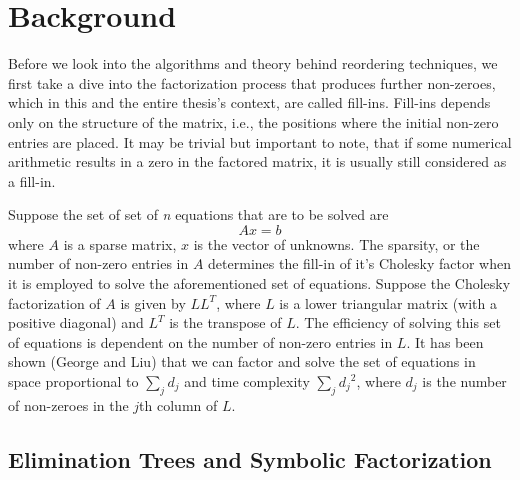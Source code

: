 

\chapter{Background}
\label{ch:background}



Before we look into the algorithms and theory behind reordering techniques, we first take a dive into the factorization process that produces further non-zeroes, which in this and the entire thesis's context, are called fill-ins. Fill-ins depends only on the structure of the matrix, i.e., the positions where the initial non-zero entries are placed. It may be trivial but important to note, that if some numerical arithmetic results in a zero in the factored matrix, it is usually still considered as a fill-in. 

Suppose the set of set of \textit{n} equations that are to be solved are
\begin{equation}
    Ax = b
\end{equation}
where \(A\) is a sparse matrix, \(x\) is the vector of unknowns. The sparsity, or the number of non-zero entries in \(A\) determines the fill-in of it's Cholesky factor when it is employed to solve the aforementioned set of equations. 
Suppose the Cholesky factorization of \(A\) is given by \(LL^T\), where \(L\) is a lower triangular matrix (with a positive diagonal) and \(L^T\) is the transpose of \(L\). The efficiency of solving this set of equations is dependent on the number of non-zero entries in \(L\). It has been shown (George and Liu) that we can factor and solve the set of equations in space proportional to  \(\sum_j d_j\) and time complexity \(\sum_j {d_j}^2\), where \(d_j\) is the number of non-zeroes in the \(j\)th column of \(L\).


\section{Elimination Trees and Symbolic Factorization}
\label{sec:elim_tree}

